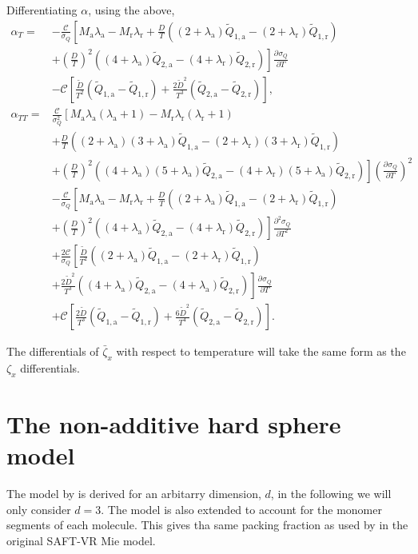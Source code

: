 \documentclass[english]{../thermomemo/thermomemo}
\newcommand*{\pd}[3][]{\frac{\partial^{#1}#2}{\partial{#3}^{#1}}}%
\newcommand*{\lb}{\left(}
\newcommand*{\rb}{\right)}
\newcommand{\lama}{\ensuremath{{\lambda_{\text{a}}}}\xspace}
\newcommand{\lamr}{\ensuremath{{\lambda_{\text{r}}}}\xspace}
\newcommand{\Dt}{\ensuremath{\tilde{D}}\xspace}
\newcommand{\Qt}{\ensuremath{\tilde{Q}}\xspace}
\newcommand{\z}{\zeta}
\newcommand{\zb}{\bar{\zeta}}
\newcommand{\att}{\ensuremath{\text{a}}\xspace}
\newcommand{\rep}{\ensuremath{\text{r}}\xspace}
\begin{document}
Differentiating $\alpha$, using the above,
\begin{align}
  \label{eq:alpha_diff_T}
  \alpha_{T} =& -\frac{\mathcal{C}}{\sigma_{Q}} \left[ M_{\att} \lama - M_{\rep}\lamr  + \frac{D}{T} \lb \lb 2+\lama\rb\Qt_{1,\att} - \lb 2+\lamr\rb\Qt_{1,\rep}\rb \right. \nonumber \\ & \left. + \lb\frac{D}{T}\rb^2 \lb \lb 4+\lama\rb\Qt_{2,\att} - \lb 4+\lamr\rb\Qt_{2,\rep} \rb\right]\pd{\sigma_{Q}}{T}  \nonumber \\ &  - \mathcal{C}\left[ \frac{\Dt}{T^2} \lb \Qt_{1,\att} - \Qt_{1,\rep}\rb + \frac{2 \Dt^2}{T^3} \lb \Qt_{2,\att} - \Qt_{2,\rep}\rb\right] ,\\
  \alpha_{TT} =& \frac{\mathcal{C}}{\sigma_{Q}^2} \left[M_{\att} \lama\lb \lama + 1\rb - M_{\rep}\lamr\lb \lamr + 1\rb \right.  \nonumber \\ &+ \frac{D}{T} \lb \lb 2+\lama\rb\lb 3+\lama\rb\Qt_{1,\att} - \lb 2+\lamr\rb \lb 3+ \lamr\rb \Qt_{1,\rep}\rb \nonumber \\ & \left. + \lb\frac{D}{T}\rb^2 \lb \lb 4+\lama\rb\lb 5+\lama\rb\Qt_{2,\att} - \lb 4+\lamr\rb\lb 5+\lama\rb\Qt_{2,\rep} \rb\right] \lb \pd{\sigma_{Q}}{T} \rb^2  \nonumber \\ & -\frac{\mathcal{C}}{\sigma_{Q}} \left[ M_{\att} \lama - M_{\rep}\lamr  + \frac{D}{T} \lb \lb 2+\lama\rb\Qt_{1,\att} - \lb 2+\lamr\rb\Qt_{1,\rep}\rb \right. \nonumber \\ & \left. + \lb\frac{D}{T}\rb^2 \lb \lb 4+\lama\rb\Qt_{2,\att} - \lb 4+\lamr\rb\Qt_{2,\rep} \rb\right]\pd[2]{\sigma_{Q}}{T} \nonumber \\ &  + \frac{2\mathcal{C}}{\sigma_{Q}}\left[ \frac{\Dt}{T^2} \lb \lb 2+\lama\rb\Qt_{1,\att} - \lb 2+\lamr\rb\Qt_{1,\rep}\rb \right. \nonumber \\ & \left.+ \frac{2 \Dt^2}{T^3} \lb \lb 4+\lama\rb\Qt_{2,\att} - \lb 4+\lama\rb\Qt_{2,\rep}\rb\right]\pd{\sigma_{Q}}{T} \nonumber \\ &  + \mathcal{C}\left[ \frac{2 \Dt}{T^3} \lb \Qt_{1,\att} - \Qt_{1,\rep}\rb + \frac{6 \Dt^2}{T^4} \lb \Qt_{2,\att} - \Qt_{2,\rep}\rb\right].
\end{align}

The differentials of $\zb_x$ with respect to temperature will take the
same form as the $\z_x$ differentials.

\section{The non-additive hard sphere model}
The model by \citet{Santos2005} is derived for an arbitarry dimension,
$d$, in the following we will only consider $d=3$. The model is also
extended to account for the monomer segments of each molecule. This
gives tha same packing fraction as used by \cite{Lafitte2013} in the
original SAFT-VR Mie model.
\end{document}
